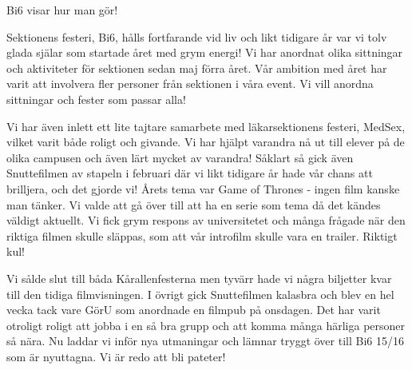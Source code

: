 \begin{news}{3}{Bi6 visar hur man gör!}{}{}{}

Sektionens festeri, Bi6, hålls fortfarande vid liv och likt tidigare år var
vi tolv glada själar som startade året med grym energi! Vi har anordnat olika
sittningar och aktiviteter för sektionen sedan maj förra året. Vår ambition med
året har varit att involvera fler personer från sektionen i våra event. Vi vill
anordna sittningar och fester som passar alla! 

Vi har även inlett ett lite
tajtare samarbete med läkarsektionens festeri, MedSex, vilket varit både roligt
och givande. Vi har hjälpt varandra nå ut till elever på de olika campusen och
även lärt mycket av varandra! Såklart så gick även Snuttefilmen av stapeln i
februari där vi likt tidigare år hade vår chans att brilljera, och det gjorde
vi! Årets tema var Game of Thrones - ingen film kanske man tänker. Vi valde att
gå över till att ha en serie som tema då det kändes väldigt aktuellt. Vi fick
grym respons av universitetet och många frågade när den riktiga filmen skulle
släppas, som att vår introfilm skulle vara en trailer. Riktigt kul!

Vi sålde slut till båda Kårallenfesterna men tyvärr hade vi några biljetter 
kvar till den tidiga filmvisningen. I övrigt gick Snuttefilmen kalasbra och 
blev en hel vecka tack vare GörU som anordnade en filmpub på onsdagen. Det har 
varit otroligt roligt att jobba i en så bra grupp och att komma många härliga
personer så nära. Nu laddar vi inför nya utmaningar och lämnar tryggt över till
Bi6 15/16 som är nyuttagna. Vi är redo att bli pateter!
\\



\end{news}
